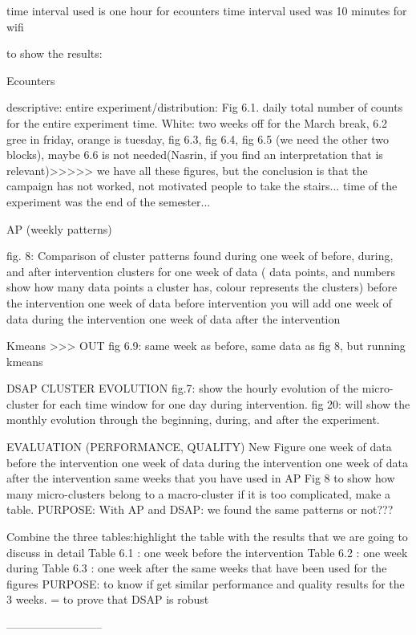 time interval used is one hour for ecounters
time interval used was 10 minutes for wifi



to show the results:

Ecounters 

descriptive: entire experiment/distribution: Fig 6.1. daily total number of counts for the entire experiment time. White: two weeks off for the March break, 6.2 gree in friday, orange is tuesday, fig 6.3, fig 6.4,  fig 6.5 (we need the other two blocks), maybe 6.6 is not needed(Nasrin, if you find an interpretation that is relevant)>>>>> we have all these figures, but the conclusion is that the campaign has not worked, not motivated people to take the stairs... time of the experiment was the end of the semester...

AP (weekly patterns)

fig. 8: Comparison of cluster patterns found during one week of before, during, and after intervention
clusters for one week of data ( data points, and numbers show how many data points a cluster has, colour represents the clusters) before the intervention 
one week of data before intervention
you will add
one week of data during the intervention
one week of data after the intervention

Kmeans >>>  OUT
fig 6.9: same week as before, same data as fig 8, but running kmeans


DSAP
CLUSTER EVOLUTION
fig.7: show the hourly evolution of the micro-cluster for each time window for one day during intervention.
fig 20: will show the monthly evolution through the beginning, during, and after the experiment. 

EVALUATION (PERFORMANCE, QUALITY)
New Figure
one week of data before the intervention
one week of data during the intervention
one week of data after the intervention
same weeks that you have used in AP Fig 8
to show how many micro-clusters belong to a macro-cluster
if it is too complicated, make a table.
PURPOSE: With AP and DSAP: we found the same patterns or not???

Combine the three tables:highlight the table with the results that we are going to discuss in detail
Table 6.1 : one week before the intervention
Table 6.2  : one week during
Table 6.3 : one week after
the same weeks that have been used for the figures
PURPOSE: to know if get similar performance and quality results for the 3 weeks. = to prove that DSAP is robust




--------------------------



